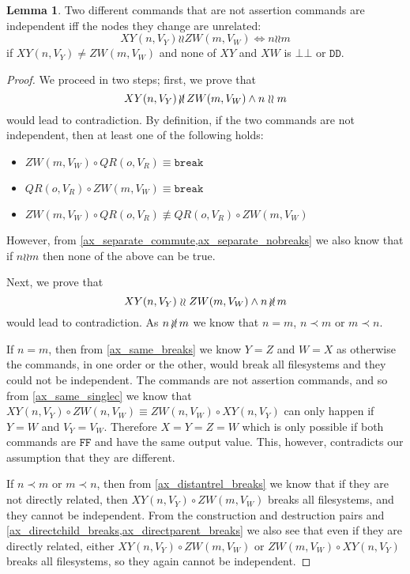 \documentclass[12pt]{article}
\newcommand{\empt}{\bot}
\newcommand{\cbrk}{\mathtt{break}} %
\newcommand{\fscommand}[2]{{#1#2}}
\newcommand{\fsregcommandchar}[1]{\mathtt{#1}}
\newcommand{\fsregcommand}[2]{\fscommand{\fsregcommandchar{#1}}{\fsregcommandchar{#2}}}
\newcommand{\cbb}{\fsregcommand{\empt}{\empt}}
\newcommand{\cff}{\fsregcommand{F}{F}}
\newcommand{\cdd}{\fsregcommand{D}{D}}
\newcommand{\cxy}{\fscommand{X}{Y}}
\newcommand{\cxw}{\fscommand{X}{W}}
\newcommand{\czw}{\fscommand{Z}{W}}
\newcommand{\cqr}{\fscommand{Q}{R}}
\newcommand{\cc}{\circ} %
\newcommand{\descendant}{\prec}
\newcommand{\nequiv}{\not\equiv}
\newcommand{\indep}{\mathrel{\wr\wr}} %
\newcommand{\unrel}{\indep} %
\newcommand{\nindep}{\,{\centernot{\wr\wr}}\,} %
\newcommand{\nunrel}{\nindep} %
\theoremstyle{definition}
\newtheorem{mylem}{Lemma}
\begin{document}
\begin{mylem}\label{unrelated_is_independent}
Two different commands that are not assertion commands are independent iff the nodes they change are unrelated:
\[ \cxy(n,V_Y)\indep\czw(m,V_W) \Leftrightarrow n\unrel m \]
if $\cxy(n,V_Y)\neq\czw(m,V_W)$ and none of $\cxy$ and $\cxw$ is $\cbb$ or $\cdd$.
\end{mylem}
\begin{proof}
We proceed in two steps; first, we prove that
\[ \cxy(n,V_Y)\nindep\czw(m,V_W) \wedge n\unrel m \] would lead to contradiction.
By definition, if the two commands are not independent, then at least one of the following holds:
\begin{itemize}
\item $\czw(m,V_W)\cc \cqr(o,V_R) \equiv\cbrk$
\item $\cqr(o,V_R)\cc \czw(m,V_W) \equiv\cbrk$
\item $\czw(m,V_W)\cc \cqr(o,V_R) \nequiv \cqr(o,V_R)\cc \czw(m,V_W)$
\end{itemize}
However, from \cref{ax_separate_commute,ax_separate_nobreaks} we also know that
if $n\unrel m$ then none of the above can be true.

Next, we prove that
\[ \cxy(n,V_Y)\indep\czw(m,V_W) \wedge n\nunrel m \] would lead to contradiction.
As $n\nunrel m$
we know that $n=m$, $n\descendant m$ or $m\descendant n$.

If $n=m$, then from \cref{ax_same_breaks} we know $Y=Z$ and $W=X$
as otherwise the commands, in one order or the other, would break all filesystems
and they could not be independent.
The commands are not assertion commands, and so from \cref{ax_same_singlec}
we know that $\cxy(n,V_Y)\cc\czw(n,V_W)\equiv\czw(n,V_W)\cc\cxy(n,V_Y)$ can only happen if $Y=W$ and $V_Y=V_W$.
Therefore $X=Y=Z=W$ which is only possible if both commands are $\cff$ and have the same
output value. This, however, contradicts our assumption that they are different.

If $n\descendant m$ or $m\descendant n$, then
from \cref{ax_distantrel_breaks} we know that if they are not directly related,
then $\cxy(n,V_Y)\cc\czw(m,V_W)$ breaks all filesystems, and they cannot be independent.
From the construction and destruction pairs and 
\cref{ax_directchild_breaks,ax_directparent_breaks} we also see that
even if they are directly related, either
$\cxy(n,V_Y)\cc\czw(m,V_W)$ or $\czw(m,V_W)\cc\cxy(n,V_Y)$ 
breaks all filesystems, so they again cannot be independent.
\end{proof}
\end{document}
